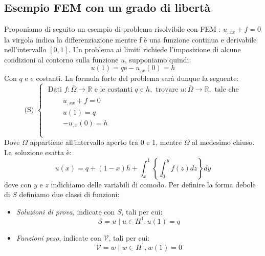     \subsection{Esempio FEM con un grado di libertà}
    Proponiamo di seguito un esempio di problema risolvibile con FEM \cite{HughesThomasJ.R2000Tfem}:
    $u_{,xx} + f = 0$
    la virgola indica la differenziazione mentre f è una funzione continua
    e derivabile nell'intervallo $\left[0,1\right]$. Un problema ai limiti richiede
    l'imposizione di alcune condizioni al contorno sulla funzione $u$, supponiamo quindi:
    \begin{equation}
        u(1) = q \text{e} -u_{,x}(0)=h
    \end{equation}
    Con $q$ e $e$ costanti. La formula forte del problema sarà dunque la seguente:
    \begin{equation}
        \text { (S) }\left\{\begin{array}{l}
        \text { Dati } f: \bar{\Omega} \rightarrow \mathbb{R} \text { e le costanti } q \text { e } h, \text { trovare } u: \bar{\Omega} \rightarrow \mathbb{R}, \text { tale che } \\
        \qquad
        \begin{array}{c}
        u_{, x x}+f=0 \\
        u(1)=q \\
        -u_{, x}(0)=h \\
        \end{array} \\
        \end{array}\right.
    \end{equation}
    Dove $\Omega$ appartiene all'intervallo aperto tra 0 e 1, mentre $\bar{\Omega}$ al
    medesimo chiuso.
    La soluzione esatta è:
    \begin{equation}
        u(x)=q+(1-x) h+\int_{x}^{1}\left\{\int_{0}^{y} f(z) d z\right\} d y
    \end{equation}
    dove con $y$ e $z$ indichiamo delle variabili di comodo.
    Per definire la forma debole di $S$ definiamo due classi di funzioni:
    \begin{itemize}
        \item \textit{Soluzioni di prova}, indicate con $S$, tali per cui:
        \begin{equation}
            \mathcal{S}=u \mid u \in H^{1}, u(1)=q
        \end{equation}
        \item \textit{Funzioni peso}, indicate con $\mathcal{V}$, tali per cui:
        \begin{equation}
            \mathcal{V}=w \mid w \in H^{1}, w(1)=0
        \end{equation}
    \end{itemize}

